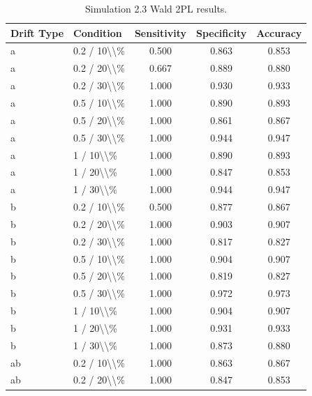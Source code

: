 \begin{table}[!h]
\centering
\caption{\label{tab:tab:sim23_2pl}Simulation 2.3 Wald 2PL results.}
\centering
\begin{tabular}[t]{llccc}
\toprule
Drift Type & Condition & Sensitivity & Specificity & Accuracy\\
\midrule
a & 0.2 / 10\textbackslash{}\textbackslash{}\% & 0.500 & 0.863 & 0.853\\
a & 0.2 / 20\textbackslash{}\textbackslash{}\% & 0.667 & 0.889 & 0.880\\
a & 0.2 / 30\textbackslash{}\textbackslash{}\% & 1.000 & 0.930 & 0.933\\
a & 0.5 / 10\textbackslash{}\textbackslash{}\% & 1.000 & 0.890 & 0.893\\
a & 0.5 / 20\textbackslash{}\textbackslash{}\% & 1.000 & 0.861 & 0.867\\
\addlinespace
a & 0.5 / 30\textbackslash{}\textbackslash{}\% & 1.000 & 0.944 & 0.947\\
a & 1 / 10\textbackslash{}\textbackslash{}\% & 1.000 & 0.890 & 0.893\\
a & 1 / 20\textbackslash{}\textbackslash{}\% & 1.000 & 0.847 & 0.853\\
a & 1 / 30\textbackslash{}\textbackslash{}\% & 1.000 & 0.944 & 0.947\\
b & 0.2 / 10\textbackslash{}\textbackslash{}\% & 0.500 & 0.877 & 0.867\\
\addlinespace
b & 0.2 / 20\textbackslash{}\textbackslash{}\% & 1.000 & 0.903 & 0.907\\
b & 0.2 / 30\textbackslash{}\textbackslash{}\% & 1.000 & 0.817 & 0.827\\
b & 0.5 / 10\textbackslash{}\textbackslash{}\% & 1.000 & 0.904 & 0.907\\
b & 0.5 / 20\textbackslash{}\textbackslash{}\% & 1.000 & 0.819 & 0.827\\
b & 0.5 / 30\textbackslash{}\textbackslash{}\% & 1.000 & 0.972 & 0.973\\
\addlinespace
b & 1 / 10\textbackslash{}\textbackslash{}\% & 1.000 & 0.904 & 0.907\\
b & 1 / 20\textbackslash{}\textbackslash{}\% & 1.000 & 0.931 & 0.933\\
b & 1 / 30\textbackslash{}\textbackslash{}\% & 1.000 & 0.873 & 0.880\\
ab & 0.2 / 10\textbackslash{}\textbackslash{}\% & 1.000 & 0.863 & 0.867\\
ab & 0.2 / 20\textbackslash{}\textbackslash{}\% & 1.000 & 0.847 & 0.853\\

\end{tabular}
\end{table}
